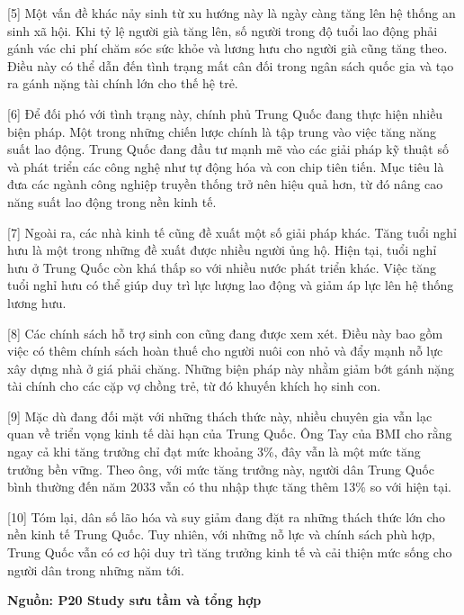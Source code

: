 \documentclass[12pt,a4paper,twoside]{article}
\newenvironment{readingpassage}[1][]{%
    \begin{tcolorbox}[enhanced, colback=grayLight, colframe=secondaryBlue,
        coltitle=textDark, fonttitle=\bfseries, title={#1},
        rounded corners, arc=3mm, boxrule=1pt,
        left=15pt, right=15pt, top=10pt, bottom=10pt,
        breakable, before skip=10pt, after skip=10pt, drop fuzzy shadow]
    \setstretch{1.3}
}{\end{tcolorbox}}
\begin{document}
\begin{readingpassage}[]
[5] Một vấn đề khác nảy sinh từ xu hướng này là ngày càng tăng lên hệ thống an sinh xã hội. Khi tỷ lệ người già tăng lên, số người trong độ tuổi lao động phải gánh vác chi phí chăm sóc sức khỏe và lương hưu cho người già cũng tăng theo. Điều này có thể dẫn đến tình trạng mất cân đối trong ngân sách quốc gia và tạo ra gánh nặng tài chính lớn cho thế hệ trẻ.

[6] Để đối phó với tình trạng này, chính phủ Trung Quốc đang thực hiện nhiều biện pháp. Một trong những chiến lược chính là tập trung vào việc tăng năng suất lao động. Trung Quốc đang đầu tư mạnh mẽ vào các giải pháp kỹ thuật số và phát triển các công nghệ như tự động hóa và con chip tiên tiến. Mục tiêu là đưa các ngành công nghiệp truyền thống trở nên hiệu quả hơn, từ đó nâng cao năng suất lao động trong nền kinh tế.

[7] Ngoài ra, các nhà kinh tế cũng đề xuất một số giải pháp khác. Tăng tuổi nghỉ hưu là một trong những đề xuất được nhiều người ủng hộ. Hiện tại, tuổi nghỉ hưu ở Trung Quốc còn khá thấp so với nhiều nước phát triển khác. Việc tăng tuổi nghỉ hưu có thể giúp duy trì lực lượng lao động và giảm áp lực lên hệ thống lương hưu.

[8] Các chính sách hỗ trợ sinh con cũng đang được xem xét. Điều này bao gồm việc có thêm chính sách hoàn thuế cho người nuôi con nhỏ và đẩy mạnh nỗ lực xây dựng nhà ở giá phải chăng. Những biện pháp này nhằm giảm bớt gánh nặng tài chính cho các cặp vợ chồng trẻ, từ đó khuyến khích họ sinh con.

[9] Mặc dù đang đối mặt với những thách thức này, nhiều chuyên gia vẫn lạc quan về triển vọng kinh tế dài hạn của Trung Quốc. Ông Tay của BMI cho rằng ngay cả khi tăng trưởng chỉ đạt mức khoảng 3\%, đây vẫn là một mức tăng trưởng bền vững. Theo ông, với mức tăng trưởng này, người dân Trung Quốc bình thường đến năm 2033 vẫn có thu nhập thực tăng thêm 13\% so với hiện tại.

[10] Tóm lại, dân số lão hóa và suy giảm đang đặt ra những thách thức lớn cho nền kinh tế Trung Quốc. Tuy nhiên, với những nỗ lực và chính sách phù hợp, Trung Quốc vẫn có cơ hội duy trì tăng trưởng kinh tế và cải thiện mức sống cho người dân trong những năm tới.

\hfill \textbf{Nguồn: P20 Study sưu tầm và tổng hợp}
\end{readingpassage}
\end{document}
